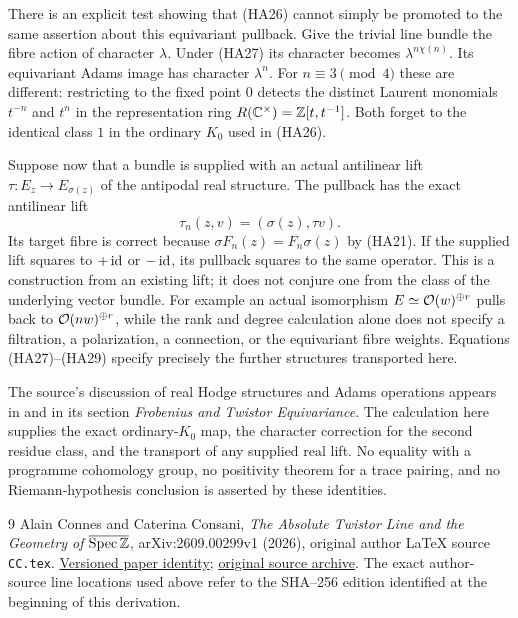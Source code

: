 There is an explicit test showing that (HA26) cannot simply be promoted
to the same assertion about this equivariant pullback. Give the trivial
line bundle the fibre action of character $\lambda$. Under (HA27) its
character becomes $\lambda^{n\chi(n)}$. Its equivariant Adams image
has character $\lambda^n$. For $n\equiv3\pmod4$ these are different:
restricting to the fixed point $0$ detects the distinct Laurent monomials
$t^{-n}$ and $t^n$ in the representation ring
$R(\mathbb C^\times)=\mathbb Z[t,t^{-1}]$. Both forget to the identical class $1$
in the ordinary $K_0$ used in (HA26).

Suppose now that a bundle is supplied with an actual antilinear lift
$\tau:E_z\to E_{\sigma(z)}$ of the antipodal real structure. The
pullback has the exact antilinear lift
\begin{equation}\tag{HA29}
 \tau_n(z,v)=(\sigma(z),\tau v).
\end{equation}
Its target fibre is correct because
$\sigma F_n(z)=F_n\sigma(z)$ by (HA21).
If the supplied lift squares to $+\operatorname{id}$ or $-\operatorname{id}$, its pullback squares
to the same operator. This is a construction from an existing lift;
it does not conjure one from the class of the underlying vector bundle.
For example an actual isomorphism $E\simeq\mathcal O(w)^{\oplus r}$ pulls back
to $\mathcal O(nw)^{\oplus r}$, while the rank and degree calculation alone
does not specify a filtration, a polarization, a connection, or the
equivariant fibre weights. Equations (HA27)--(HA29) specify precisely
the further structures transported here.

The source's discussion of real Hodge structures and Adams operations
appears in  and in its section \emph{Frobenius and
Twistor Equivariance}. The calculation here supplies the exact
ordinary-$K_0$ map, the character correction for the second residue
class, and the transport of any supplied real lift. No equality with a
programme cohomology group, no positivity theorem for a trace pairing,
and no Riemann-hypothesis conclusion is asserted by these identities.

\begin{thebibliography}{9}
Alain Connes and Caterina Consani,
\emph{The Absolute Twistor Line and the Geometry of
$\overline{\operatorname{Spec}\mathbb Z}$},
arXiv:2609.00299v1 (2026), original author LaTeX source
\texttt{CC.tex}.
\href{https://arxiv.org/abs/2609.00299v1}{Versioned paper identity};
\href{https://arxiv.org/src/2609.00299v1}{original source archive}.
The exact author-source line locations used above refer to the SHA--256
edition identified at the beginning of this derivation.
\end{thebibliography}
